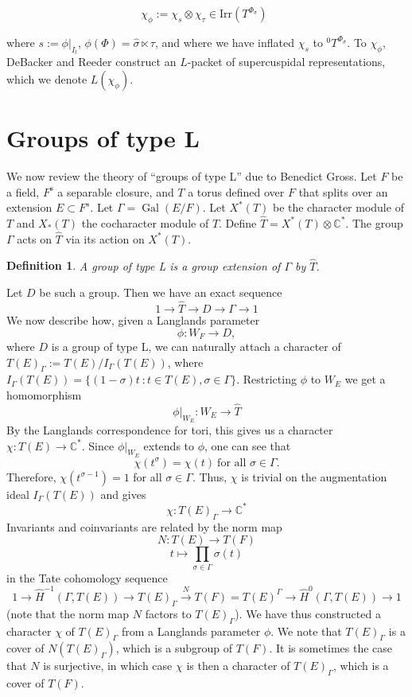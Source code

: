 \documentclass[11pt]{amsart}
\theoremstyle{plain}
\newtheorem{definition}[enumi]{Definition}
\DeclareMathOperator{\Gal}{Gal}
\begin{document}
\begin{equation}
\chi_{\phi} := \chi_s \otimes \chi_{\tau} \in \mathrm{Irr}(T^{\Phi_{\sigma}}) \ \ \label{chitau}
\end{equation}

\noindent where $s := \phi|_{I_t}$, $\phi(\Phi) = \hat{\sigma} \ltimes \tau$, and where we have inflated $\chi_s$ to ${}^0 T^{\Phi_{\sigma}}$.  To $\chi_{\phi}$, DeBacker and Reeder construct an $L$-packet of supercuspidal representations, which we denote $L(\chi_{\phi})$.

\section{Groups of type L}\label{groupsoftypeL}
We now review the theory of ``groups of type L'' due to Benedict Gross.  Let $F$ be a field, $F^{\mathrm s}$ a separable closure, and $T$ a torus defined over $F$ that splits over an extension $E \subset F^s$.
Let $\Gamma = \Gal(E/F)$.  Let $X^*(T)$ be the character module of $T$ and $X_*(T)$ the cocharacter
module of $T$.  Define $\hat{T} = X^*(T) \otimes \mathbb{C}^*$.
The group $\Gamma$ acts on $\hat{T}$ via its action on $X^*(T)$.

\begin{definition}
A \emph{group of type L} is a group extension of $\Gamma$ by $\hat{T}$.
\end{definition}

Let $D$ be such a group.  Then we have an exact sequence
$$1 \rightarrow \hat{T} \rightarrow D \rightarrow \Gamma \rightarrow 1$$
We now describe how, given a Langlands parameter $$\phi : W_F \rightarrow D,$$ where $D$ is a group of type L, we can naturally attach a character of $T(E)_{\Gamma} := T(E) / I_{\Gamma}(T(E))$, where $I_{\Gamma}(T(E)) = \{(1 - \sigma)t \ : t \in T(E), \sigma \in \Gamma \}$.
Restricting $\phi$ to $W_E$ we get a homomorphism $$\phi|_{W_E} : W_E \rightarrow \hat{T}$$
By the Langlands correspondence for tori, this gives us a character $\chi : T(E) \rightarrow \mathbb{C}^*$.  Since $\phi|_{W_E}$ extends to $\phi$, one can see that
$$\chi(t^{\sigma}) = \chi(t)\ \mbox{for all $\sigma \in \Gamma$.}$$
Therefore, $\chi(t^{\sigma - 1}) = 1$ for all $\sigma \in \Gamma$.  Thus, $\chi$ is trivial on the augmentation ideal $I_{\Gamma}(T(E))$
and gives $$\chi : T(E)_\Gamma \rightarrow \mathbb{C}^*$$
Invariants and coinvariants are related by the norm map $$N : T(E) \rightarrow T(F)$$ $$t \mapsto \displaystyle\prod_{\sigma \in \Gamma} \sigma(t)$$ in the Tate cohomology sequence
$$1 \rightarrow \hat{H}^{-1}(\Gamma,T(E)) \rightarrow T(E)_{\Gamma} \xrightarrow{N} T(F) = T(E)^{\Gamma} \rightarrow \hat{H}^0(\Gamma,T(E)) \rightarrow 1$$ (note that the norm map $N$ factors to $T(E)_{\Gamma}$).
We have thus constructed a character $\chi$ of $T(E)_{\Gamma}$ from a Langlands parameter $\phi$. We note that $T(E)_{\Gamma}$ is a cover of $N(T(E)_{\Gamma})$, which is a subgroup of $T(F)$.  It is sometimes the case that $N$ is surjective, in which case $\chi$ is then a character of $T(E)_{\Gamma}$, which is a cover of $T(F)$.
\end{document}
